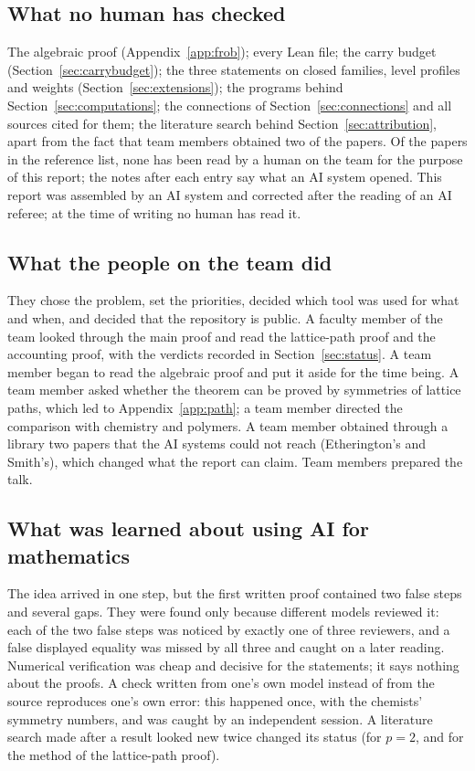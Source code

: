 \documentclass[11pt]{article}
\theoremstyle{definition}
\theoremstyle{remark}
\numberwithin{equation}{section}
\numberwithin{figure}{section}
\begin{document}
\subsection{What no human has checked}
The algebraic proof (Appendix~\ref{app:frob}); every Lean file; the carry budget
(Section~\ref{sec:carrybudget}); the three statements on closed families, level profiles and weights
(Section~\ref{sec:extensions}); the programs behind Section~\ref{sec:computations}; the connections of
Section~\ref{sec:connections} and all sources cited for them; the literature search behind
Section~\ref{sec:attribution}, apart from the fact that team members obtained two of the papers. Of the papers
in the reference list, none has been read by a human on the team for the purpose of this report; the notes
after each entry say what an AI system opened.
This report was assembled by an AI system and corrected after the reading of an AI referee; at the time of
writing no human has read it.

\subsection{What the people on the team did}
They chose the problem, set the priorities, decided which tool was used for what and when, and decided that
the repository is public. A faculty member of the team looked through the main proof and read the
lattice-path proof and the accounting proof, with the verdicts recorded in Section~\ref{sec:status}. A team
member began to read the algebraic proof and put it aside for the time being. A team
member asked whether the theorem can be proved by symmetries of lattice paths, which led to
Appendix~\ref{app:path}; a team member directed the comparison with chemistry and polymers. A team member obtained
through a library two papers that the AI systems could not reach (Etherington's and Smith's), which changed
what the report can claim. Team members prepared the talk.

\subsection{What was learned about using AI for mathematics}
The idea arrived in one step, but the first written proof contained two false steps and several gaps. They
were found only because different models reviewed it: each of the two false steps was noticed by exactly one
of three reviewers, and a false displayed equality was missed by all three and caught on a later reading.
Numerical verification was cheap and decisive for the statements; it says nothing about the proofs. A check
written from one's own model instead of from the source reproduces one's own error: this happened once, with
the chemists' symmetry numbers, and was caught by an independent session. A literature search made after a
result looked new twice changed its status (for $p=2$, and for the method of the lattice-path proof).
\end{document}
